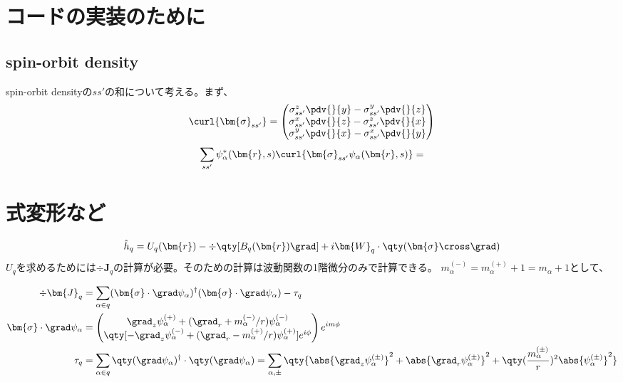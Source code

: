 \documentclass[a4paper,11pt,uplatex]{jsarticle}%
\begin{document}
\section{コードの実装のために}
\subsection{spin-orbit density}
spin-orbit densityの$ss'$の和について考える。まず、
\begin{equation}
  \curl{\bm{\sigma}_{ss'}} = 
  \begin{pmatrix}
    \sigma_{ss'}^z\pdv{}{y} - \sigma_{ss'}^y\pdv{}{z} \\
    \sigma_{ss'}^x\pdv{}{z} - \sigma_{ss'}^z\pdv{}{x} \\
    \sigma_{ss'}^y\pdv{}{x} - \sigma_{ss'}^x\pdv{}{y}
  \end{pmatrix}
\end{equation}
\begin{equation}
  \sum_{ss'}\psi^*_{\alpha}(\bm{r},s)\curl{\bm{\sigma}_{ss'}\psi_\alpha(\bm{r},s)} = 
\end{equation}

\section{式変形など}

\begin{equation}
  \hat{h}_q = U_q(\bm{r}) - \div\qty[B_q(\bm{r})\grad] + i\bm{W}_q\cdot\qty(\bm{\sigma}\cross \grad)
\end{equation}
$U_q$を求めるためには$\div{\bm{J}}_q$の計算が必要。そのための計算は波動関数の1階微分のみで計算できる。
$m_{\alpha}^{(-)}=m_{\alpha}^{(+)}+1 = m_{\alpha}+1$として、

\begin{align}
  \div{\bm{J}}_q &= \sum_{\alpha\in q}(\bm{\sigma}\cdot\grad\psi_\alpha)^{\dagger}(\bm{\sigma}\cdot\grad\psi_\alpha) - \tau_q \\
\bm{\sigma}\cdot\grad\psi_\alpha &= 
  \begin{pmatrix}
    \grad_z\psi_\alpha^{(+)} + (\grad_r + m_\alpha^{(-)}/r)\psi_\alpha^{(-)} \\
    \qty[-\grad_z\psi_\alpha^{(-)} + (\grad_r - m_\alpha^{(+)} /r)\psi_\alpha^{(+)}]e^{i\phi}
  \end{pmatrix}e^{im\phi} \\
  \tau_q &= \sum_{\alpha\in q}\qty(\grad\psi_\alpha)^{\dagger}\cdot\qty(\grad\psi_\alpha) = \sum_{\alpha,\pm}\qty{\abs{\grad_z\psi_{\alpha}^{(\pm)}}^2 + \abs{\grad_r\psi_{\alpha}^{(\pm)}}^2 + \qty(\frac{m_{\alpha}^{(\pm)}}{r})^2\abs{\psi_{\alpha}^{(\pm)}}^2}
\end{align}
\newpage
\end{document}
